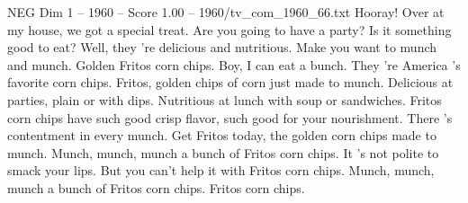 \begin{textsample}{NEG Dim 1 – 1960 – Score 1.00 – 1960/tv\_com\_1960\_66.txt}  \label{ex:f1_neg_080}
Hooray!
Over at my house, we got a special treat.
Are you going to have a party?
Is it something good to eat?
Well, they 're delicious and nutritious.
Make you want to munch and munch.
Golden Fritos corn chips.
Boy, I can eat a bunch.
They 're America 's favorite corn chips.
Fritos, golden chips of corn just made to munch.
Delicious at parties, plain or with dips.
Nutritious at lunch with soup or sandwiches.
Fritos corn chips have such good crisp flavor, such good for your nourishment.
There 's contentment in every munch.
Get Fritos today, the golden corn chips made to munch.
Munch, munch, munch a bunch of Fritos corn chips.
It 's not polite to smack your lips.
But you can't help it with Fritos corn chips.
Munch, munch, munch a bunch of Fritos corn chips.
Fritos corn chips.

\end{textsample}
